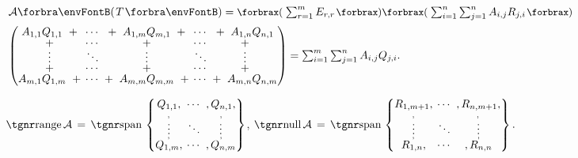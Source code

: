 \!$\hText{\mathcal{A}\Par{T}=\textstyle\XPar{\sum_{r=1}^m E_{r,r}}\XPar{\textstyle\sum_{i=1}^n\sum_{j=1}^n A_{i,j}R_{j,i}}\\[6pt]{\normalsize\begin{pmatrix}
A_{1,1}Q_{1,1}\;\;+&\hspace{-6pt}\cdots &\hspace{-6pt}+\;\;A_{1,m}Q_{m,1}\;\;+&\hspace{-6pt}\cdots &\hspace{-6pt}+\;\;A_{1,n}Q_{n,1}\\[-2pt]
+&\hspace{-6pt}\cdots &\hspace{-6pt}+&\hspace{-6pt}\cdots &\hspace{-6pt}+\\[-4pt]
\vdots &\hspace{-6pt} \ddots &\hspace{-6pt} \vdots &\hspace{-6pt} \ddots &\hspace{-6pt} \vdots\\[-4pt]
+&\hspace{-6pt}\cdots &\hspace{-6pt}+&\hspace{-6pt}\cdots &\hspace{-6pt}+\\[-2pt]
A_{m,1}Q_{1,m}\;\;+&\hspace{-6pt}\cdots &\hspace{-6pt}+\;\;A_{m,m}Q_{m,m}\;\;+&\hspace{-6pt}\cdots &\hspace{-6pt}+\;\;A_{m,n}Q_{n,m}
\end{pmatrix}}=\textstyle\sum_{i=1}^m\sum_{j=1}^n A_{i,j}Q_{j,i}.}$\par\quad
$\range \mathcal{A}\,=\,\Spn${\normalsize$\begin{Bmatrix} \underset{\;,}{Q_{1,1}}, &\hspace{-6pt} \cdots &\hspace{-6pt} ,\underset{\!,}{Q_{n,1}},\\[-2pt] \vdots &\hspace{-6pt} \ddots &\hspace{-6pt} \vdots\\[-2pt] \overset{\;,}{Q_{1,m}}, &\hspace{-6pt} \cdots &\hspace{-6pt} ,\overset{\!\!\!,}{Q_{n,m}}\end{Bmatrix}$}, $\null \mathcal{A}\,=\,\Spn${\normalsize$\begin{Bmatrix} \underset{\;,}{R_{1,m+1}}, &\hspace{-6pt} \cdots &\hspace{-6pt} ,\underset{\!\!,}{R_{n,m+1}},\\[-2pt] \vdots &\hspace{-6pt} \ddots &\hspace{-6pt} \vdots\\[-2pt] \overset{\;,}{R_{1,n}}, &\hspace{-6pt} \cdots &\hspace{-6pt} ,\overset{\!\!\!,}{R_{n,n}}\end{Bmatrix}.$}

